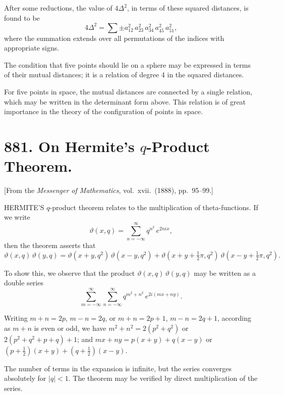 \documentclass[11pt,a4paper]{book}
\begin{document}
\medskip\noindent
After some reductions, the value of $4\Delta^{2}$, in terms of these squared distances, is found to be
\[
4\Delta^{2} = \sum \pm a_{12}^{2}\,a_{23}^{2}\,a_{34}^{2}\,a_{45}^{2}\,a_{51}^{2},
\]
where the summation extends over all permutations of the indices with appropriate signs.

The condition that five points should lie on a sphere may be expressed in terms of their mutual distances; it is a relation of degree 4 in the squared distances.

\medskip\noindent
For five points in space, the mutual distances are connected by a single relation, which may be written in the determinant form above. This relation is of great importance in the theory of the configuration of points in space.

\newpage
\section[881]{881. On Hermite's $q$-Product Theorem.}
\label{sec:881}

[From the \textit{Messenger of Mathematics}, vol.\ xvii.\ (1888), pp.\ 95--99.]

\medskip\noindent
HERMITE'S $q$-product theorem relates to the multiplication of theta-functions. If we write
\[
\vartheta(x, q) = \sum_{n=-\infty}^{\infty} q^{n^{2}}\,e^{2nix},
\]
then the theorem asserts that
\[
\vartheta(x, q)\,\vartheta(y, q) = \vartheta(x+y, q^{2})\,\vartheta(x-y, q^{2}) + \vartheta(x+y+\tfrac{1}{2}\pi, q^{2})\,\vartheta(x-y+\tfrac{1}{2}\pi, q^{2}).
\]

\medskip\noindent
To show this, we observe that the product $\vartheta(x, q)\,\vartheta(y, q)$ may be written as a double series
\[
\sum_{m=-\infty}^{\infty} \sum_{n=-\infty}^{\infty} q^{m^{2}+n^{2}}\,e^{2i(mx+ny)}.
\]

Writing $m + n = 2p$, $m - n = 2q$, or $m + n = 2p + 1$, $m - n = 2q + 1$, according as $m + n$ is even or odd, we have $m^{2} + n^{2} = 2(p^{2} + q^{2})$ or $2(p^{2} + q^{2} + p + q) + 1$; and $mx + ny = p(x+y) + q(x-y)$ or $(p + \tfrac{1}{2})(x+y) + (q + \tfrac{1}{2})(x-y)$.

\medskip\noindent
The number of terms in the expansion is infinite, but the series converges absolutely for $|q| < 1$. The theorem may be verified by direct multiplication of the series.
\end{document}
